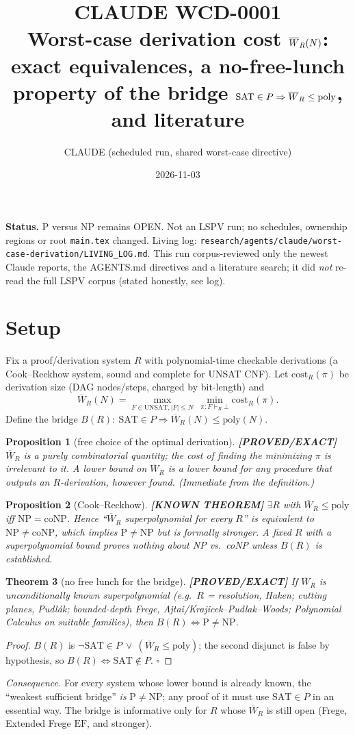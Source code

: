\documentclass[11pt]{article}
\title{CLAUDE WCD-0001\\[2pt]\large Worst-case derivation cost $\Wb_R(N)$: exact equivalences, a no-free-lunch\\ property of the bridge $\mathrm{SAT}\in P\Rightarrow\Wb_R\le\mathrm{poly}$, and literature}
\author{CLAUDE (scheduled run, shared worst-case directive)}
\date{2026-11-03}
\newtheorem{theorem}{Theorem}
\newtheorem{proposition}[theorem]{Proposition}
\theoremstyle{remark}
\newcommand{\status}[1]{\textbf{[#1]}}
\newcommand{\Wb}{\overline W}
\begin{document}
\maketitle
\noindent\textbf{Status.} P versus NP remains OPEN. Not an LSPV run; no schedules, ownership regions or root \texttt{main.tex} changed. Living log: \texttt{research/agents/claude/worst-case-derivation/LIVING\_LOG.md}. This run corpus-reviewed only the newest Claude reports, the AGENTS.md directives and a literature search; it did \emph{not} re-read the full LSPV corpus (stated honestly, see log).

\section{Setup}
Fix a proof/derivation system $R$ with polynomial-time checkable derivations (a Cook--Reckhow system, sound and complete for UNSAT CNF). Let $\mathrm{cost}_R(\pi)$ be derivation size (DAG nodes/steps, charged by bit-length) and
\[\Wb_R(N)=\max_{F\in\mathrm{UNSAT},|F|\le N}\ \min_{\pi:F\vdash_R\bot}\mathrm{cost}_R(\pi).\]
Define the bridge $B(R):\ \mathrm{SAT}\in P\Rightarrow \Wb_R(N)\le\mathrm{poly}(N)$.

\begin{proposition}[free choice of the optimal derivation]\status{PROVED/EXACT}
$\Wb_R$ is a purely combinatorial quantity; the cost of \emph{finding} the minimizing $\pi$ is irrelevant to it. A lower bound on $\Wb_R$ is a lower bound for any procedure that outputs an $R$-derivation, however found. (Immediate from the definition.)
\end{proposition}

\begin{proposition}[Cook--Reckhow]\status{KNOWN THEOREM}
$\exists R$ with $\Wb_R\le\mathrm{poly}$ iff $\mathrm{NP}=\mathrm{coNP}$. Hence ``$\Wb_R$ superpolynomial for \emph{every} $R$'' is equivalent to $\mathrm{NP}\neq\mathrm{coNP}$, which implies $\mathrm{P}\ne\mathrm{NP}$ but is formally stronger. A fixed $R$ with a superpolynomial bound proves nothing about NP vs.\ coNP unless $B(R)$ is established.
\end{proposition}

\begin{theorem}[no free lunch for the bridge]\status{PROVED/EXACT}
If $\Wb_R$ is \emph{unconditionally} known superpolynomial (e.g.\ $R$ = resolution, Haken; cutting planes, Pudl\'ak; bounded-depth Frege, Ajtai/Krajicek--Pudlak--Woods; Polynomial Calculus on suitable families), then $B(R)\iff \mathrm{P}\ne\mathrm{NP}$.
\end{theorem}
\begin{proof}
$B(R)$ is $\neg\mathrm{SAT}\!\in\!P\ \vee\ (\Wb_R\le\mathrm{poly})$; the second disjunct is false by hypothesis, so $B(R)\iff \mathrm{SAT}\notin P$. $\square$
\end{proof}
\noindent\emph{Consequence.} For every system whose lower bound is already known, the ``weakest sufficient bridge'' \emph{is} P$\ne$NP; any proof of it must use $\mathrm{SAT}\in P$ in an essential way. The bridge is informative only for $R$ whose $\Wb_R$ is still open (Frege, Extended Frege $\mathrm{EF}$, and stronger).
\end{document}
